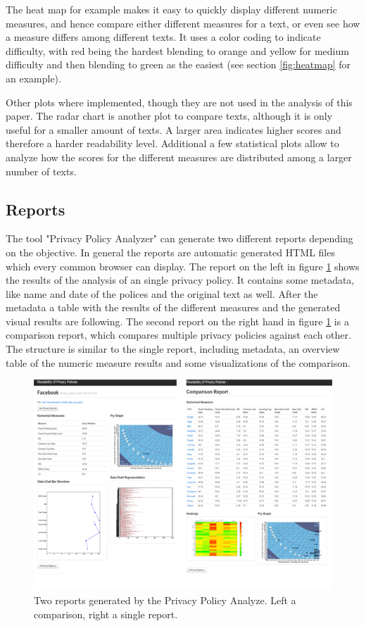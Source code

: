 \documentclass[runningheads,a4paper]{llncs}
\begin{document}
The heat map for example makes it easy to quickly display different numeric measures, and hence compare either different measures for a text, or even see how a measure differs among different texts. It uses a color coding to indicate difficulty, with red being the hardest blending to orange and yellow for medium difficulty and then blending to green as the easiest (see section \ref{fig:heatmap} for an example).

Other plots where implemented, though they are not used in the analysis of this paper. The radar chart is another plot to compare texts, although it is only useful for a smaller amount of texts. A larger area indicates higher scores and therefore a harder readability level. Additional a few statistical plots allow to analyze how the scores for the different measures are distributed among a larger number of texts.


\subsection{Reports}
The tool "Privacy Policy Analyzer" can generate two different reports depending on the objective. In general the reports are automatic generated HTML files which every common browser can display.
The report on the left in figure \ref{fig:reports} shows the results of the analysis of an single privacy policy. It contains some metadata, like name and date of the polices and the original text as well. After the metadata a table with the results of the different measures and the generated visual results are following. The second report on the right hand in figure \ref{fig:reports} is a comparison report, which compares multiple privacy policies against each other. The structure is similar to the single report, including metadata, an overview table of the numeric measure results and some visualizations of the comparison.

\begin{figure}
\centering
\includegraphics[width=\textwidth]{Bilder/reports2.png}
\caption{Two reports generated by the Privacy Policy Analyze. Left a comparison, right a single report.}
\label{fig:reports}
\end{figure}
\end{document}
